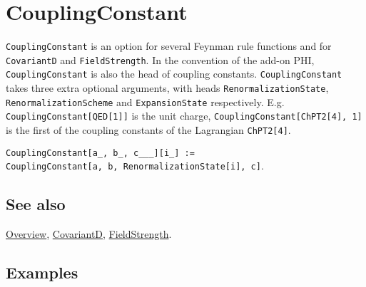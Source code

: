 \documentclass[../FeynCalcManual.tex]{subfiles}
\begin{document}
\hypertarget{couplingconstant}{%
\section{CouplingConstant}\label{couplingconstant}}

\texttt{CouplingConstant} is an option for several Feynman rule
functions and for \texttt{CovariantD} and \texttt{FieldStrength}. In the
convention of the add-on PHI, \texttt{CouplingConstant} is also the head
of coupling constants. \texttt{CouplingConstant} takes three extra
optional arguments, with heads \texttt{RenormalizationState},
\texttt{RenormalizationScheme} and \texttt{ExpansionState} respectively.
E.g. \texttt{CouplingConstant[\allowbreak{}QED[\allowbreak{}1]]} is the
unit charge,
\texttt{CouplingConstant[\allowbreak{}ChPT2[\allowbreak{}4],\ \allowbreak{}1]}
is the first of the coupling constants of the Lagrangian
\texttt{ChPT2[\allowbreak{}4]}.

\texttt{CouplingConstant[\allowbreak{}a_,\ \allowbreak{}b_,\ \allowbreak{}c___][\allowbreak{}i_] := CouplingConstant[\allowbreak{}a,\ \allowbreak{}b,\ \allowbreak{}RenormalizationState[\allowbreak{}i],\ \allowbreak{}c]}.

\subsection{See also}

\hyperlink{toc}{Overview}, \hyperlink{covariantd}{CovariantD},
\hyperlink{fieldstrength}{FieldStrength}.

\subsection{Examples}
\end{document}
